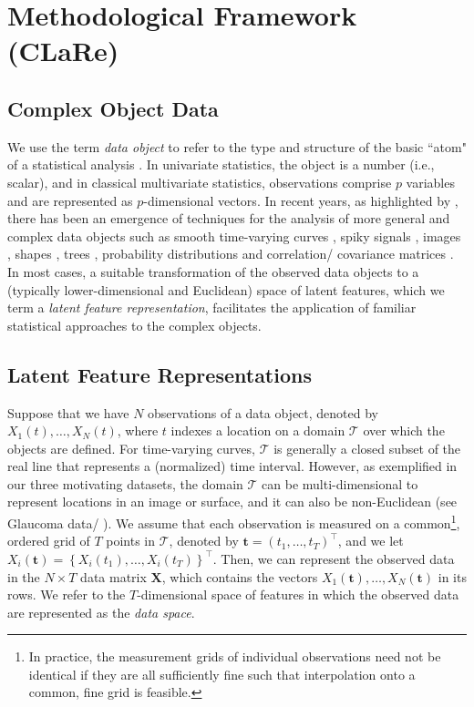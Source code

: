 \section{Methodological Framework (CLaRe)}\label{sec:materials-and-methods}


\subsection{Complex Object Data}

We use the term \emph{data object} to refer to the type and structure of the basic ``atom" of a statistical analysis
\parencite[][p.1]{marron_object_2021}.
In univariate statistics, the object is a number (i.e., scalar), and in classical multivariate statistics, observations comprise $p$ variables and are represented as $p$-dimensional vectors.
In recent years, as highlighted by \textcite[Chapter 1]{marron_object_2021}, there has been an emergence of techniques for the analysis of more general and complex data objects such as smooth time-varying curves \parencite{ramsay_functional_2005}, spiky signals \parencite{morris_wavelet-based_2006}, images \parencite{morris_automated_2011}, shapes \parencite{srivastava_shape_2011}, trees \parencite{wang_object_2007}, probability distributions \parencite{petersen_functional_2016, yang_quantile_2020} and correlation/ covariance matrices \parencite{desai_connectivity_2023}.
In most cases, a suitable transformation of the observed data objects to a (typically lower-dimensional and Euclidean) space of latent features, which we term a \emph{latent feature representation}, facilitates the application of familiar statistical approaches to the complex objects.

\subsection{Latent Feature Representations}

Suppose that we have $N$ observations of a data object, denoted by $X_1 (t), \dots, X_N(t)$, where $t$ indexes a location on a domain $\mathcal{T}$ over which the objects are defined.
For time-varying curves, $\mathcal{T}$ is generally a closed subset of the real line that represents a (normalized) time interval.
However, as exemplified in our three motivating datasets, the domain $\mathcal{T}$ can be multi-dimensional to represent locations in an image or surface, and it can also be non-Euclidean ({see Glaucoma data/ \textcite{lee_bayesian_2019}}).
We assume that each observation is measured on a common\footnote{In practice, the measurement grids of individual observations need not be identical if they are all sufficiently fine such that interpolation onto a common, fine grid is feasible.}, ordered grid of $T$ points in $\mathcal{T}$, denoted by $\mathbf{t} = \left(t_1, \dots, t_T\right)^\top$, and we let $X_i(\mathbf{t}) = \left\{X_i(t_1), \dots, X_i(t_T)\right\}^\top$.
Then, we can represent the observed data in the $N \times T$ data matrix $\mathbf{X}$, which contains the vectors $X_1(\mathbf{t}), \dots, X_N(\mathbf{t})$ in its rows.
We refer to the $T$-dimensional space of features in which the observed data are represented as the \emph{data space}.

